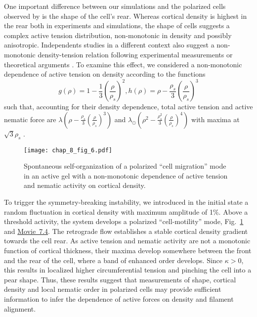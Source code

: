 {One important difference between our simulations and the polarized cells observed by \citet{Ruprecht:2015aa} is the shape of the cell's rear. Whereas cortical density is highest in the rear both in experiments and simulations, the shape of cells suggests a complex active tension distribution, non-monotonic in density and possibly anisotropic. Independents studies in a different context also suggest a non-monotonic density-tension relation following experimental measurements \cite{chugh2017} or theoretical arguments  \cite{callan2013}. To examine this effect, we considered a non-monotonic dependence of active tension on density according to the functions 
\begin{equation} \label{77_III}
    g(\rho)  = 1-  \frac{1}{3} \left( \frac{\rho}{\rho_s}\right)^2,     h(\rho) = \rho-  \frac{\rho_s}{3} \left( \frac{\rho}{\rho_s}\right)^3
\end{equation}
such that, accounting for their density dependence, total active tension and active nematic force are $\lambda\left(\rho-  \frac{ \rho_s}{3} \left( \frac{\rho}{\rho_s}\right)^3 \right)$ and $\lambda_{\odot}\left(\rho^2-  \frac{\rho_s^2}{3} \left( \frac{\rho}{ \rho_s}\right)^4 \right)$ with maxima at $\sqrt{3}\rho_s$ \cite{torres2019, Ruprecht:2015aa}. 

\begin{figure}[H]
\centering
\texttt{[image: chap\_8\_fig\_6.pdf]}
\caption{Spontaneous self-organization of a polarized ``cell migration'' mode in an active gel with a non-monotonic dependence of active tension and nematic activity on cortical density.}
\label{fig_5_III}
\end{figure} 

To trigger the symmetry-breaking instability, we introduced in the initial state a random fluctuation in cortical density with maximum amplitude of 1\%. Above a threshold activity, the system develops a polarized ``cell-motility'' mode, Fig.~\ref{fig_5_III} and \href{https://github.com/waleedmirzaPhD/movies_thesis.git}{Movie~7.4}. The retrograde flow establishes a stable cortical density gradient towards the cell rear. As active tension and nematic activity are not a monotonic function of cortical thickness, their maxima  develop somewhere between the front and the rear of the cell, where a band of enhanced order develops. Since $\kappa>0$, this results in localized higher circumferential tension and pinching the cell into a pear shape. Thus, these results suggest that measurements of shape, cortical density and local nematic order in polarized cells may provide sufficient information to infer the dependence of active forces on density and filament alignment. %

}
